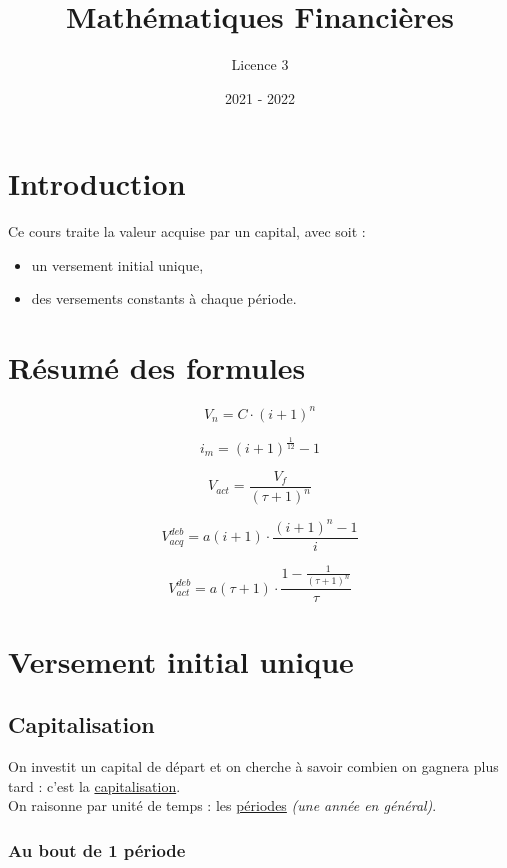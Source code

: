 \documentclass{article}
\title{Mathématiques Financières}
\author{Licence 3}
\date{2021 - 2022}
\begin{document}
\normalsize
\maketitle

\renewcommand*\contentsname{Table des matières}
\tableofcontents
\newpage

\section{Introduction}
Ce cours traite la valeur acquise par un capital, avec soit :


\begin{itemize}
   \item un versement initial unique,
   \item des versements constants à chaque période.
\end{itemize}

\section{Résumé des formules}

{
\large
$$ V_n = C\cdot(i+1)^n$$

$$i_m = (i+1)^{\frac{1}{12}} - 1$$

$$V_{act} = \dfrac{V_f}{(\tau+1)^n}$$

$$V^{deb}_{acq} = a(i+1)\cdot\dfrac{(i+1)^n-1}{i}$$

$$V^{deb}_{act} = a(\tau+1)\cdot\dfrac{1-\frac{1}{(\tau+1)^n}}{\tau}$$
}




\newpage
\section{Versement initial unique}

\subsection{Capitalisation}
On investit un capital de départ et on cherche à savoir combien on gagnera plus tard : c'est la \underline{capitalisation}. 
\\ On raisonne par unité de temps : les  \underline{périodes} \textit{(une année en général)}.

\subsubsection{Au bout de 1 période}
\end{document}
